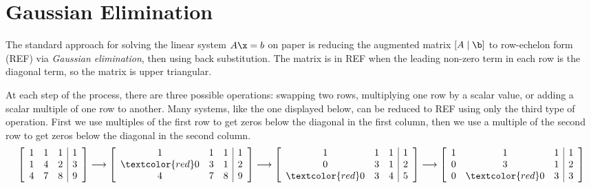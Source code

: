 
\section*{Gaussian Elimination} %

The standard approach for solving the linear system $A\x = b$ on paper is reducing the augmented matrix $\left[A\mid\b\right]$ to row-echelon form (REF) via \emph{Gaussian elimination}, then using back substitution.
The matrix is in REF when the leading non-zero term in each row is the diagonal term, so the matrix is upper triangular.

At each step of the process, there are three possible operations: swapping two rows, multiplying one row by a scalar value, or adding a scalar multiple of one row to another.
Many systems, like the one displayed below, can be reduced to REF using only the third type of operation.
First we use multiples of the first row to get zeros below the diagonal in the first column, then we use a multiple of the second row to get zeros below the diagonal in the second column.
%
\begin{align*}
\left[\begin{array}{ccc|c}
1 & 1 & 1 & 1 \\
1 & 4 & 2 & 3 \\
4 & 7 & 8 & 9 \\
\end{array}\right]
\longrightarrow
\left[\begin{array}{ccc|c}
1 & 1 & 1 & 1 \\
\textcolor{red}0 & 3 & 1 & 2 \\
4 & 7 & 8 & 9 \\
\end{array}\right]
\longrightarrow
\left[\begin{array}{ccc|c}
1 & 1 & 1 & 1 \\
0 & 3 & 1 & 2 \\
\textcolor{red}0 & 3 & 4 & 5 \\
\end{array}\right]
\longrightarrow
\left[\begin{array}{ccc|c}
1 & 1 & 1 & 1 \\
0 & 3 & 1 & 2 \\
0 & \textcolor{red}0 & 3 & 3
\end{array}\right]
\end{align*}

